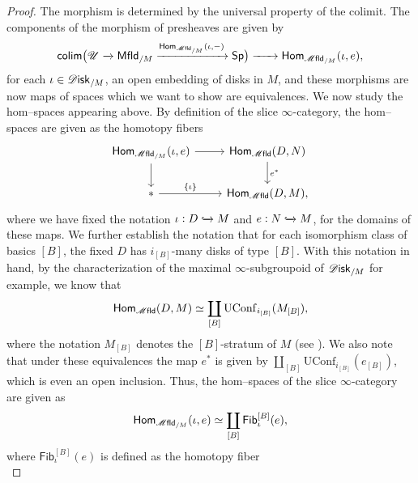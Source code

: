 \documentclass[../text.tex]{subfiles}
\begin{document}
\begin{proof}
    The morphism is determined by the universal property of the colimit. The components of the morphism of presheaves are given by
    \begin{equation}
        \mathsf{colim} \big( \mathscr{U} \xrightarrow{} \mfld[r]_{/M} \xrightarrow{\mathsf{Hom}_{\mfld_{/M}}(\iota, -)} \mathsf{Sp} \big) \xrightarrow{\ \ \ \ \ } \mathsf{Hom}_{\mfld_{/M}}(\iota, e),
    \end{equation}
    for each $\iota \in \disk_{/M}$, an open embedding of disks in $M$, and these morphisms are now maps of spaces which we want to show are equivalences. We now study the hom--spaces appearing above. By definition of the slice $\infty$-category, the hom--spaces are given as the homotopy fibers
    \begin{equation}
        \begin{tikzcd}
            \mathsf{Hom}_{\mfld_{/M}} (\iota, e) \arrow[d] \arrow[r] & \mathsf{Hom}_{\mfld}(D, N) \arrow[d, "e^*"] \\
            * \arrow[r, "\{\iota\}"] & \mathsf{Hom}_{\mfld}(D, M),
        \end{tikzcd}
    \end{equation}
    where we have fixed the notation $\iota: D \xhookrightarrow{} M$ and $e: N \xhookrightarrow{} M$, for the domains of these maps. We further establish the notation that for each isomorphism class of basics $[B]$, the fixed $D$ has $i_{[B]}$-many disks of type $[B]$. With this notation in hand, by the characterization of the maximal $\infty$-subgroupoid of $\disk_{/M}$ \cite[Lem.2.21]{aft_fhstrat} for example, we know that
    \begin{equation}
        \mathsf{Hom}_{\mfld}(D, M) \simeq \coprod_{[B]} \mathrm{UConf}_{i_{[B]}}(M_{[B]}),
    \end{equation}
    where the notation $M_{[B]}$ denotes the $[B]$-stratum of $M$ (see \cite[Prop.4.4.7]{aft_localstrut}). We also note that under these equivalences the map $e^*$ is given by $\coprod_{[B]} \mathrm{UConf}_{i_{[B]}}(e_{[B]})$, which is even an open inclusion. Thus, the hom--spaces of the slice $\infty$-category are given as 
    \begin{equation}
        \mathsf{Hom}_{\mfld_{/M}} (\iota, e) \simeq \coprod_{[B]} \mathsf{Fib}_\iota^{[B]}(e),
    \end{equation}
    where $\mathsf{Fib}_\iota^{[B]}(e)$ is defined as the homotopy fiber
    \begin{equation}

\end{equation}
\end{proof}
\end{document}
